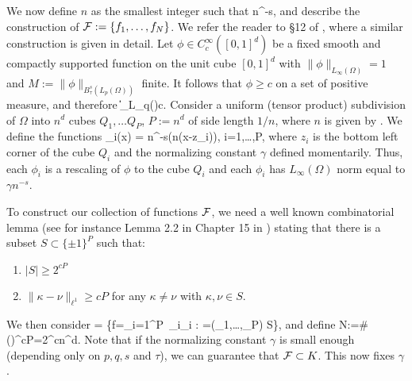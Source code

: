 We now define  $n$ as the smallest integer such that
\be 
\label{defn}
n^{-s}\le \e,
\ee
and describe the construction of ${\cal F}:=\{f_1,\dots,f_N\}$. We refer the reader to \S 12 of \cite{BDPS}, where a similar construction is given in detail.
Let $\phi\in C^\infty_c([0,1]^d)$ be a fixed smooth and compactly supported function on the unit cube $[0,1]^d$ with $\| \phi\|_{L_\infty(\Omega)}= 1$ and $M:=\|\phi\|_{B_\tau^s(L_p(\Omega))}$ finite. It follows that $\phi\ge c$ on a set of positive measure, and therefore
\be 
\label{Lqphi}
\|\phi\|_{L_q(\Omega)}\ge c.
\ee
Consider a uniform (tensor product) subdivision of $\Omega$ into $n^d$ cubes $Q_1,\dots Q_{P}$, $P:=n^d$  of side length $1/n$, where $n$ is given by . 
We define the functions
\be
    \phi_i(x) =  \gamma n^{-s}\phi(n(x-z_i)), \quad i=1,\dots,P,
\ee
where $z_i$ is the bottom left corner of the cube $Q_i$ and the normalizing constant $\gamma$ defined momentarily. Thus, each $\phi_i$ is a rescaling of $\phi$ to the cube $Q_i$ and each $\phi_i$ has $L_\infty(\Omega)$ norm equal to $\gamma n^{-s}$.

To construct our  collection of functions  ${\cal F}$, we need a well known combinatorial lemma (see for instance Lemma 2.2 in Chapter 15 in \cite{lorentz1996constructive}) stating that  there is a subset $S\subset \{\pm 1\}^P$ such that:
\begin{enumerate}
    \item $|S| \geq 2^{cP}$
    \item $\|\kappa - \nu\|_{\ell^1} \geq cP$ for any $\kappa\neq \nu$ with $\kappa,\nu\in S$.
\end{enumerate}
We then consider
\be
    = \left\{f=\sum_{i=1}^P\ \kappa_i\phi_i \: : \: \kappa=(\kappa_1,\dots,\kappa_P) \in S\right\},
\ee
and define 
\be 
\label{defN}
N:=\#(\cF)^{cP}=2^{cn^d}.
\ee 
Note that if the normalizing constant $\gamma$ is small enough (depending only on $p,q,s$ and $\tau$), we can guarantee that  ${\cal F}\subset K$.   This now fixes $\gamma$.   

